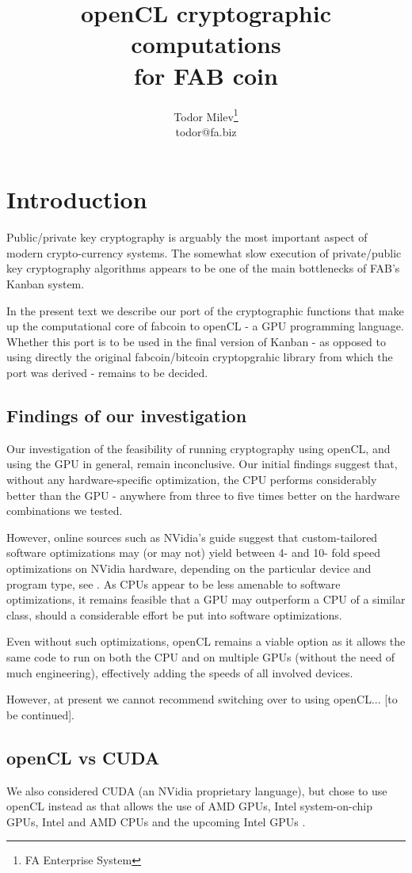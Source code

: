 \documentclass{article}
\title{
openCL cryptographic computations \\
for FAB coin
}
\author{Todor Milev\footnote{FA Enterprise System}\\ todor@fa.biz}
\begin{document}
\maketitle
\section{Introduction}
Public/private key cryptography is arguably the most important aspect of modern crypto-currency systems. The somewhat slow execution of private/public key cryptography algorithms appears to be one of the main bottlenecks of FAB's Kanban system. 

In the present text we describe our port of the cryptographic functions that make up the computational core of fabcoin to openCL - a GPU programming language. Whether this port is to be used in the final version of Kanban - as opposed to using directly the original fabcoin/bitcoin cryptopgrahic library from which the port was derived - remains to be decided.


\subsection{Findings of our investigation}
Our investigation of the feasibility of running cryptography using openCL, and using the GPU in general, remain inconclusive. Our initial findings suggest that, without any hardware-specific optimization, the CPU performs considerably better than the GPU - anywhere from three to five times better on the hardware combinations we tested. 

However, online sources such as NVidia's guide \cite{NVIDIA:openCLBestPractices} suggest that custom-tailored software optimizations may (or may not) yield between 4- and 10- fold speed optimizations on NVidia hardware, depending on the particular device and program type, see \cite[page 22]{NVIDIA:openCLBestPractices}. As CPUs appear to be less amenable to software optimizations, it remains feasible that a GPU may outperform a CPU of a similar class, should a considerable effort be put into software optimizations. 

Even without such optimizations, openCL remains a viable option as it allows the same code to run on both the CPU and on multiple GPUs (without the need of much engineering), effectively adding the speeds of all involved devices. 

However, at present we cannot recommend switching over to using openCL... [to be continued].


\subsection{openCL vs CUDA}
We also considered CUDA (an NVidia proprietary language), but chose to use openCL instead as that allows the use of AMD GPUs, Intel system-on-chip GPUs, Intel and AMD CPUs and the upcoming Intel GPUs \cite{forbes:IntelGPUupcoming}. 
\end{document}
